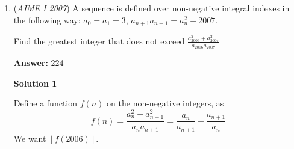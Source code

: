 \begin{enumerate}
 

 Extend $\overline{RQ}$ and $\overline{AB}$. The point of intersection is $H$. Connect $\overline{PH}$. $\overline{EB}$ intersects $\overline{PH}$ at $X$. Do the same for $\overline{QR}$ and $\overline{AD}$, and let the intersections be $I$ and $Y$

 Because $Q$ is the midpoint of $\overline{BC}$, and $\overline{AB}\parallel\overline{DC}$, so $\triangle{RQC}\cong\triangle{HQB}$. $\overline{BH}=2$. 

 Because $\overline{BH}=2$, we can use mass point geometry to get that $\overline{PX}=\overline{XH}$. $|\triangle{XHQ}|=\frac{\overline{XH}}{\overline{PH}}\cdot\frac{\overline{QH}}{\overline{HI}}\cdot|\triangle{PHI}|=\frac{1}{6}\cdot|\triangle{PHI}|$ 

 Using the same principle, we can get that $|\triangle{IYR}|=\frac{1}{6}|\triangle{PHI}|$

 Therefore, the area of $PYRQX$ is $\frac{2}{3}\cdot|\triangle{PHI}|$
$\overline{RQ}=2\sqrt{2}$, so $\overline{IH}=6\sqrt{2}$. Using the law of cosines, $\overline{PH}=\sqrt{28}$. The area of $\triangle{PHI}=\frac{1}{2}\cdot\sqrt{28-18}\cdot6\sqrt{2}=6\sqrt{5}$

 Using this, we can get the area of $PYRQX = \sqrt{80}$ so the answer is $\fbox{080}$.

 


 \href{https://mathproblemsolvingskills.wordpress.com/}{MathProblemSolvingSkills.com}

 


 


	\item (\textit{AIME I 2007}) A sequence is defined over non-negative integral indexes in the following way: $a_{0}=a_{1}=3$, $a_{n+1}a_{n-1}=a_{n}^{2}+2007$.


 Find the greatest integer that does not exceed $\frac{a_{2006}^{2}+a_{2007}^{2}}{a_{2006}a_{2007}}$

 \textbf{Answer: }224



\textbf{Solution 1}

Define a function $f(n)$ on the non-negative integers, as 
 \[f(n) = \frac{a_n^2 + a_{n+1}^2}{a_na_{n+1}} = \frac{a_n}{a_{n+1}}+\frac{a_{n+1}}{a_{n}}\]We want $\left\lfloor f(2006) \right\rfloor$. 


\end{enumerate}
